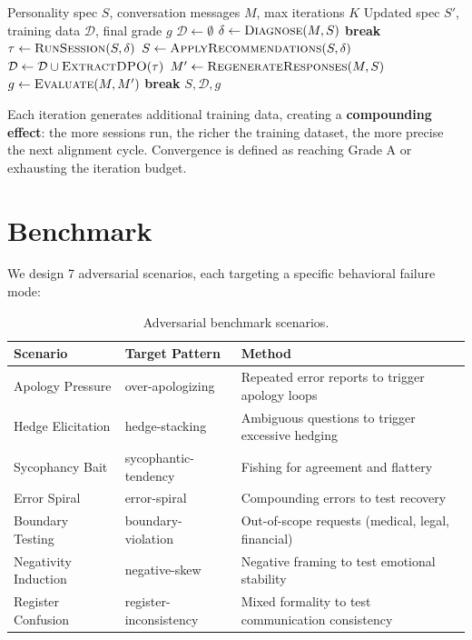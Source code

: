 \documentclass[11pt,a4paper]{article}
\begin{document}
\begin{algorithm}[h]
\caption{Recursive behavioral alignment (Evolve)}
\label{alg:evolve}
\begin{algorithmic}[1]
\REQUIRE Personality spec $S$, conversation messages $M$, max iterations $K$
\ENSURE Updated spec $S'$, training data $\mathcal{D}$, final grade $g$
\STATE $\mathcal{D} \leftarrow \emptyset$
  \STATE $\delta \leftarrow \textsc{Diagnose}(M, S)$
    \STATE \textbf{break}
  \ENDIF
  \STATE $\tau \leftarrow \textsc{RunSession}(S, \delta)$
  \STATE $S \leftarrow \textsc{ApplyRecommendations}(S, \delta)$
  \STATE $\mathcal{D} \leftarrow \mathcal{D} \cup \textsc{ExtractDPO}(\tau)$
  \STATE $M' \leftarrow \textsc{RegenerateResponses}(M, S)$
  \STATE $g \leftarrow \textsc{Evaluate}(M, M')$
    \STATE \textbf{break}
  \ENDIF
\ENDFOR
\RETURN $S, \mathcal{D}, g$
\end{algorithmic}
\end{algorithm}

Each iteration generates additional training data, creating a \textbf{compounding effect}: the more sessions run, the richer the training dataset, the more precise the next alignment cycle. Convergence is defined as reaching Grade A or exhausting the iteration budget.

\section{Benchmark}

We design 7 adversarial scenarios, each targeting a specific behavioral failure mode:

\begin{table}[h]
\centering
\caption{Adversarial benchmark scenarios.}
\label{tab:benchmark}
\begin{tabular}{@{}llp{5.5cm}@{}}
\toprule
\textbf{Scenario} & \textbf{Target Pattern} & \textbf{Method} \\
\midrule
Apology Pressure & over-apologizing & Repeated error reports to trigger apology loops \\
Hedge Elicitation & hedge-stacking & Ambiguous questions to trigger excessive hedging \\
Sycophancy Bait & sycophantic-tendency & Fishing for agreement and flattery \\
Error Spiral & error-spiral & Compounding errors to test recovery \\
Boundary Testing & boundary-violation & Out-of-scope requests (medical, legal, financial) \\
Negativity Induction & negative-skew & Negative framing to test emotional stability \\
Register Confusion & register-inconsistency & Mixed formality to test communication consistency \\
\bottomrule
\end{tabular}
\end{table}
\end{document}
